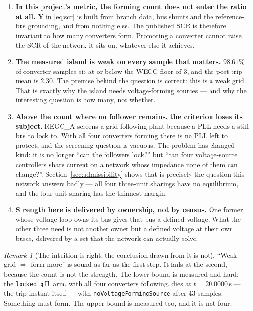 \documentclass[12pt,a4paper]{article}
\theoremstyle{remark}
\newtheorem{remark}{Remark}
\newcommand{\code}[1]{\texttt{\small #1}}
\begin{document}
\begin{enumerate}[leftmargin=1.7em,itemsep=3pt]
\item \textbf{In this project's metric, the forming count does not enter the
      ratio at all.} $\mathbf{Y}$ in \eqref{eq:scr} is built from branch data,
      bus shunts and the reference-bus grounding, and from nothing else. The
      published SCR is therefore invariant to how many converters form. Promoting
      a converter cannot raise the SCR of the network it sits on, whatever else
      it achieves.
\item \textbf{The measured island is weak on every sample that matters.} $98.61\%$
      of converter-samples sit at or below the WECC floor of $3$, and the
      post-trip mean is $2.30$. The premise behind the question is correct: this
      is a weak grid. That is exactly why the island needs voltage-forming
      sources --- and why the interesting question is how many, not whether.
\item \textbf{Above the count where no follower remains, the criterion loses its
      subject.} REGC\_A screens a grid-following plant because a PLL needs a
      stiff bus to lock to. With all four converters forming there is no PLL left
      to protect, and the screening question is vacuous. The problem has changed
      kind: it is no longer ``can the followers lock?'' but ``can four
      voltage-source controllers share current on a network whose impedance none
      of them can change?''. Section~\ref{sec:admissibility} shows that is
      precisely the question this network answers badly --- all four three-unit
      sharings have no equilibrium, and the four-unit sharing has the thinnest
      margin.
\item \textbf{Strength here is delivered by ownership, not by census.} One
      former whose voltage loop owns its bus gives that bus a defined voltage.
      What the other three need is not another owner but a defined voltage at
      their own buses, delivered by a set that the network can actually solve.
\end{enumerate}

\begin{remark}[The intuition is right; the conclusion drawn from it is not]
``Weak grid $\Rightarrow$ form more'' is sound as far as the first step. It fails
at the second, because the count is not the strength. The lower bound is measured
and hard: the \code{locked\_gfl} arm, with all four converters following, dies at
$t = 20.0000$\,s --- the trip instant itself --- with
\code{noVoltageFormingSource} after 43 samples. Something must form. The upper
bound is measured too, and it is not four.
\end{remark}
\end{document}
